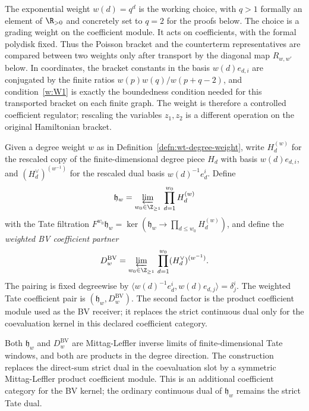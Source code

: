 \begin{rmk}\label{rmk:wt-canonical-weight}
  The exponential weight $w(d)=q^d$ is the working choice, with $q>1$
  formally an element of $\R_{>0}$ and concretely set to $q=2$ for
  the proofs below. The choice is a grading weight on the coefficient
  module.  It acts on coefficients, with the formal polydisk fixed.
  Thus the
  Poisson bracket and the counterterm representatives are compared
  between two weights only after transport by the diagonal map
  \(R_{w,w'}\) below.  In coordinates, the bracket constants in the
  basis \(w(d)e_{d,i}\) are conjugated by the finite ratios
  \(w(p)w(q)/w(p+q-2)\), and condition~\ref{w:W1} is exactly the
  boundedness condition needed for this transported bracket on each
  finite graph.  The weight is therefore a controlled coefficient
  regulator; rescaling the variables \(z_1,z_2\) is a different
  operation on the original Hamiltonian bracket.
\end{rmk}

\begin{defn}\label{defn:wt-coefficient-pair}
  Given a degree weight $w$ as in
  Definition~\ref{defn:wt-degree-weight}, write $H_d^{(w)}$ for the
  rescaled copy of the finite-dimensional degree piece
  $H_d$ with basis $w(d)e_{d,i}$, and
  $(H_d^\vee)^{(w^{-1})}$ for the rescaled dual basis
  $w(d)^{-1}e^i_d$.  Define
  \begin{equation}\label{eq:wt-h-defn}
    \mathfrak h_w=\varprojlim_{w_0\in\Z_{\geq1}}\,
      \prod_{d=1}^{w_0}H_d^{(w)}
  \end{equation}
  with the Tate filtration $F^{w_0}\mathfrak h_w=\ker(\mathfrak h_w\to
  \prod_{d\leq w_0}H_d^{(w)})$, and define the \emph{weighted BV
  coefficient partner}
  \begin{equation}\label{eq:wt-hvee-defn}
    D^{\mathrm{BV}}_w=
      \varprojlim_{w_0\in\Z_{\geq1}}\,
      \prod_{d=1}^{w_0}(H_d^\vee)^{(w^{-1})}.
  \end{equation}
  The pairing is fixed degreewise by
  $\langle w(d)^{-1}e^i_d,w(d)e_{d,j}\rangle=\delta^i_j$.
  The weighted Tate coefficient pair is
  $(\mathfrak h_w,D^{\mathrm{BV}}_w)$.  The second factor is the
  product coefficient module used as the BV receiver; it replaces the
  strict continuous dual only for the coevaluation kernel in this
  declared coefficient category.
\end{defn}

\begin{rmk}\label{rmk:wt-topology-content}
  Both $\mathfrak h_w$ and \(D^{\mathrm{BV}}_w\) are
  Mittag-Leffler inverse limits of finite-dimensional Tate windows,
  and both are products in the degree direction. The construction
  replaces the direct-sum strict dual in the coevaluation slot by a
  symmetric Mittag-Leffler product coefficient module.  This is an
  additional coefficient category for the BV kernel; the ordinary
  continuous dual of $\mathfrak h_w$ remains the strict Tate dual.
\end{rmk}


